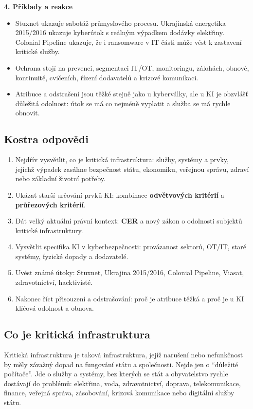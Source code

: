 \textbf{4. Příklady a reakce}
\begin{itemize}
  \item Stuxnet ukazuje sabotáž průmyslového procesu. Ukrajinská energetika 2015/2016 ukazuje kyberútok s reálným výpadkem dodávky elektřiny. Colonial Pipeline ukazuje, že i ransomware v IT části může vést k zastavení kritické služby.
  \item Ochrana stojí na prevenci, segmentaci IT/OT, monitoringu, zálohách, obnově, kontinuitě, cvičeních, řízení dodavatelů a krizové komunikaci.
  \item Atribuce a odstrašení jsou těžké stejně jako u kyberválky, ale u KI je obzvlášť důležitá odolnost: útok se má co nejméně vyplatit a služba se má rychle obnovit.
\end{itemize}

\subsection*{Kostra odpovědi}
\begin{enumerate}
  \item Nejdřív vysvětlit, co je kritická infrastruktura: služby, systémy a prvky, jejichž výpadek zasáhne bezpečnost státu, ekonomiku, veřejnou správu, zdraví nebo základní životní potřeby.
  \item Ukázat starší určování prvků KI: kombinace \textbf{odvětvových kritérií} a \textbf{průřezových kritérií}.
  \item Dát velký aktuální právní kontext: \textbf{CER} a nový zákon o odolnosti subjektů kritické infrastruktury.
  \item Vysvětlit specifika KI v kyberbezpečnosti: provázanost sektorů, OT/IT, staré systémy, fyzické dopady a dodavatelé.
  \item Uvést známé útoky: Stuxnet, Ukrajina 2015/2016, Colonial Pipeline, Viasat, zdravotnictví, hacktivisté.
  \item Nakonec říct přisouzení a odstrašování: proč je atribuce těžká a proč je u KI klíčová odolnost a obnova.
\end{enumerate}

\subsection*{Co je kritická infrastruktura}
Kritická infrastruktura je taková infrastruktura, jejíž narušení nebo nefunkčnost by měly závažný dopad na fungování státu a společnosti. Nejde jen o “důležité počítače”. Jde o služby a systémy, bez kterých se stát a obyvatelstvo rychle dostávají do problémů: elektřina, voda, zdravotnictví, doprava, telekomunikace, finance, veřejná správa, zásobování, krizová komunikace nebo digitální služby státu.

